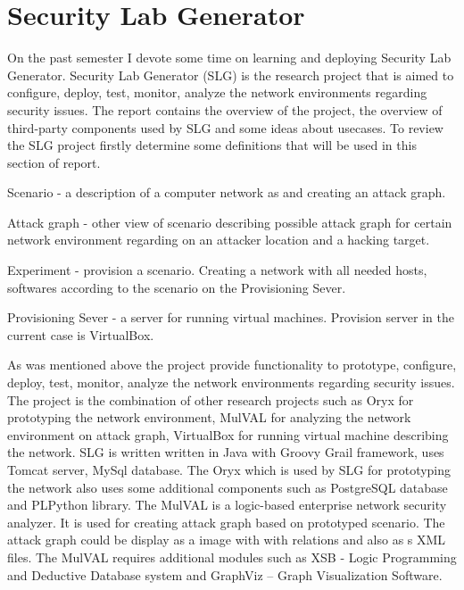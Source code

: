 %


\section{Security Lab Generator}
On the past semester I devote some time on learning and deploying Security Lab Generator.
Security Lab Generator (SLG) is the research project that is aimed to configure, deploy, test, monitor, analyze the network environments regarding security issues. The report contains the overview of the project, the overview of third-party components used by SLG and some ideas about usecases.
To review the SLG project firstly determine some definitions that will be used in this section of report. 

\begin{compactitem}
\item Scenario - a description of a computer network as and creating an attack graph. 
\item Attack graph - other view of scenario describing possible attack graph for certain network environment regarding on an attacker location and a hacking target.   
\item Experiment - provision a scenario. Creating a network with all needed hosts, softwares according to the scenario on the Provisioning Sever.
\item Provisioning Sever - a server for running virtual machines. Provision server in the current case is VirtualBox.
\end{compactitem}

As was mentioned above the project provide functionality to prototype, configure, deploy, test, monitor, analyze the network environments regarding security issues. The project is the combination of other research projects such as Oryx for prototyping the network environment, MulVAL for analyzing the network environment on attack graph, VirtualBox for running virtual machine describing the network. SLG is written written in Java with Groovy Grail framework, uses Tomcat server, MySql database. The Oryx which is used by SLG for prototyping the network also uses some additional components such as PostgreSQL database and PLPython library. The MulVAL is a logic-based enterprise network security analyzer. It is used for creating attack graph based on prototyped scenario. The attack graph could be display as a image with with relations and also as s XML files. The MulVAL requires additional modules such as XSB - Logic Programming and Deductive Database system and GraphViz – Graph Visualization Software. 

